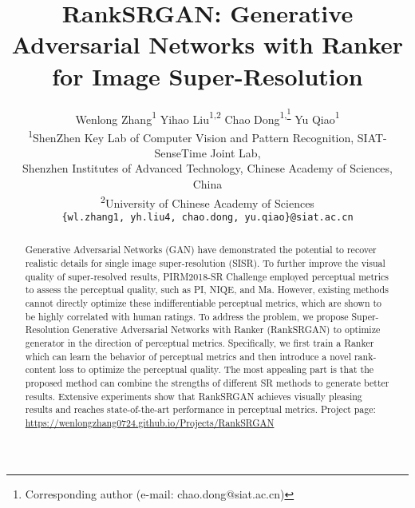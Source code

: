 \documentclass[10pt,twocolumn,letterpaper]{article}
\begin{document}
\makeatletter
\renewcommand*{\@fnsymbol}[1]{\ensuremath{\ifcase#1\or \dagger\or \dagger\or \ddagger\or
    \mathsection\or \mathparagraph\or \|\or **\or \dagger\dagger
    \or \ddagger\ddagger \else\@ctrerr\fi}}
\makeatother

\title{RankSRGAN: Generative Adversarial Networks with Ranker\\ for Image Super-Resolution}

\author{Wenlong Zhang{\textsuperscript{1}} \qquad Yihao Liu{\textsuperscript{1,2}} \qquad  Chao Dong{\textsuperscript{1,\thanks{Corresponding author (e-mail: chao.dong@siat.ac.cn) }}} \qquad Yu Qiao{\textsuperscript{1}}\\
\textsuperscript{1}ShenZhen Key Lab of Computer Vision and Pattern Recognition, SIAT-SenseTime Joint Lab,\\
 Shenzhen Institutes of Advanced Technology, Chinese Academy of Sciences, China\\
\textsuperscript{2}University of Chinese Academy of Sciences \\
{\tt\small \{wl.zhang1, yh.liu4, chao.dong, yu.qiao\}@siat.ac.cn}
}



\maketitle
\ificcvfinal\thispagestyle{empty}\fi



\begin{abstract}
Generative Adversarial Networks (GAN) have demonstrated the potential to recover realistic details for single image super-resolution (SISR). To further improve the visual quality of super-resolved results, PIRM2018-SR Challenge employed perceptual metrics to assess the perceptual quality, such as PI, NIQE, and Ma. However, existing methods cannot directly optimize these indifferentiable perceptual metrics, which are shown to be highly correlated with human ratings. To address the problem, we propose Super-Resolution Generative Adversarial Networks with Ranker (RankSRGAN) to optimize generator in the direction of perceptual metrics. Specifically, we first train a Ranker which can learn the behavior of perceptual metrics and then introduce a novel rank-content loss to optimize the perceptual quality. The most appealing part is that the proposed method can combine the strengths of different SR methods to generate better results. Extensive experiments show that RankSRGAN achieves visually pleasing results and reaches state-of-the-art performance in perceptual metrics. Project page: \url{https://wenlongzhang0724.github.io/Projects/RankSRGAN}

\end{abstract}
\end{document}

